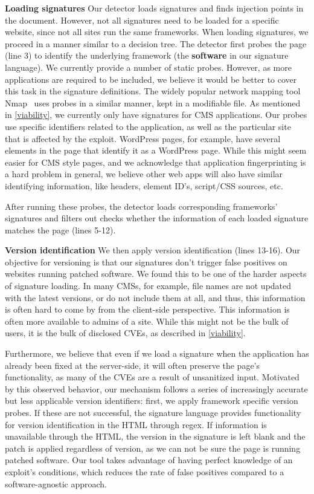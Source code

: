 \textbf{Loading signatures}
Our detector loads signatures and finds injection points in the document. However, not all signatures need to be loaded for a specific website, since not all sites run the same frameworks. When loading signatures, we proceed in a manner similar to a decision tree. The detector first probes the page (line 3) to identify the underlying framework (the \textbf{software} in our signature language). We currently provide a number of static probes. However, as more applications are required to be included, we believe it would be better to cover this task in the signature definitions. The widely popular network mapping tool Nmap~\cite{nMap} uses probes in a similar manner, kept in a modifiable file. As mentioned in \autoref{viability}, we currently only have signatures for CMS applications. Our probes use specific identifiers related to the application, as well as the particular site that is affected by the exploit. WordPress pages, for example, have several elements in the page that identify it as a WordPress page. While this might seem easier for CMS style pages, and we acknowledge that application fingerprinting is a hard problem in general, we believe other web apps will also have similar identifying information, like headers, element ID's, script/CSS sources, etc. 

After running these probes, the detector loads corresponding frameworks' signatures and filters out checks whether the information of each loaded signature matches the page (lines 5-12).

\textbf{Version identification}
We then apply version identification (lines 13-16). Our objective for versioning is that our signatures don't trigger false positives on websites running patched software. We found this to be one of the harder aspects of signature loading. In many \acp{CMS}, for example, file names are not updated with the latest versions, or do not include them at all, and thus, this information is often hard to come by from the client-side perspective. This information is often more available to admins of a site. While this might not be the bulk of users, it is the bulk of disclosed CVEs, as described in \autoref{viability}.

Furthermore, we believe that even if we load a signature when the application has already been fixed at the server-side, it will often preserve the page's functionality, as many of the CVEs are a result of unsanitized input. Motivated by this observed behavior, our mechanism follows a series of increasingly accurate but less applicable version identifiers: first, we apply framework specific version probes. If these are not successful, the signature language provides functionality for version identification in the HTML through regex. If information is unavailable through the HTML, the version in the signature is left blank and the patch is applied regardless of version, as we can not be sure the page is running patched software. Our tool takes advantage of having perfect knowledge of an exploit's conditions, which reduces the rate of false positives compared to a software-agnostic approach. 

